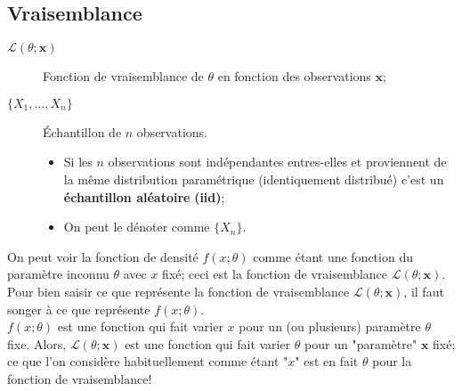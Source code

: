 \documentclass[10pt, french]{article}
\begin{document}
\begin{multicols*}{2}


\columnbreak
\section{Vraisemblance}
\begin{distributions}[Notation]
\begin{description}
	\item[$\mathcal{L}(\theta; \bm{x})$]	Fonction de vraisemblance de $\theta$ en fonction des observations $\bm{x}$;
	\item[$\{X_{1}, \dots, X_{n}\}$]	Échantillon de $n$ observations.
		\begin{itemize}[leftmargin = *]
		\item	Si les $n$ observations sont indépendantes entres-elles et proviennent de la même distribution paramétrique (identiquement distribué) c'est un \textbf{échantillon aléatoire} \textbf{(iid)};
		\item	On peut le dénoter comme $\{X_{n}\}$.
		\end{itemize}
\end{description}
\end{distributions}

On peut voir la fonction de densité $f(x; \theta)$ comme étant une fonction du paramètre inconnu $\theta$ avec $x$ fixé; ceci est la fonction de vraisemblance $\mathcal{L}(\theta; \bm{x})$.
Pour bien saisir ce que représente la fonction de vraisemblance $\mathcal{L}(\theta; \bm{x})$, il faut songer à ce que représente $f(x; \theta)$. \\
$f(x; \theta)$ est une fonction qui fait varier $x$ pour un (ou plusieurs) paramètre $\theta$ fixe. Alors, $\mathcal{L}(\theta; \bm{x})$ est une fonction qui fait varier $\theta$ pour un "paramètre" $\bm{x}$ fixé; ce que l'on considère habituellement comme étant "$x$" est en fait $\theta$ pour la fonction de vraisemblance!


\end{multicols*}
\end{document}
